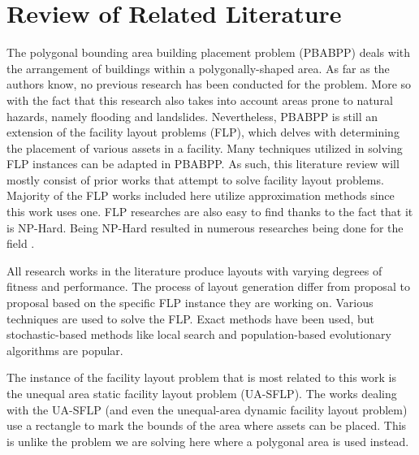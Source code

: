 \chapter{Review of Related Literature} \label{sec:rrl-title}
The polygonal bounding area building placement problem (PBABPP) deals with the arrangement of buildings within a polygonally-shaped area. As far as the authors know, no previous research has been conducted for the problem. More so with the fact that this research also takes into account areas prone to natural hazards, namely flooding and landslides. Nevertheless, PBABPP is still an extension of the facility layout problems (FLP), which delves with determining the placement of various assets in a facility. Many techniques utilized in solving FLP instances can be adapted in PBABPP. As such, this literature review will mostly consist of prior works that attempt to solve facility layout problems. Majority of the FLP works included here utilize approximation methods since this work uses one. FLP researches are also easy to find thanks to the fact that it is NP-Hard. Being NP-Hard resulted in numerous researches being done for the field \cite{Drira2007}.

All research works in the literature produce layouts with varying degrees of fitness and performance. The process of layout generation differ from proposal to proposal based on the specific FLP instance they are working on. Various techniques are used to solve the FLP. Exact methods have been used, but stochastic-based methods like local search and population-based evolutionary algorithms are popular.

The instance of the facility layout problem that is most related to this work is the unequal area static facility layout problem (UA-SFLP). The works dealing with the UA-SFLP (and even the unequal-area dynamic facility layout problem) use a rectangle to mark the bounds of the area where assets can be placed. This is unlike the problem we are solving here where a polygonal area is used instead.
